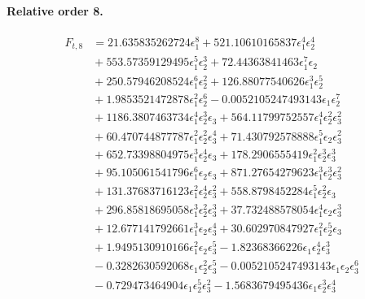 \documentclass[10pt]{article}
\begin{document}
\paragraph{Relative order 8.}
\begin{align*}
F_{t,8} &= 21.635835262724 \epsilon_{1}^{8} + 521.10610165837 \epsilon_{1}^{4} \epsilon_{2}^{4} \\
&{}  + 553.57359129495 \epsilon_{1}^{5} \epsilon_{2}^{3} + 72.44363841463 \epsilon_{1}^{7} \epsilon_{2} \\
&{}  + 250.57946208524 \epsilon_{1}^{6} \epsilon_{2}^{2} + 126.88077540626 \epsilon_{1}^{3} \epsilon_{2}^{5} \\
&{}  + 1.9853521472878 \epsilon_{1}^{2} \epsilon_{2}^{6} - 0.0052105247493143 \epsilon_{1} \epsilon_{2}^{7} \\
&{}  + 1186.3807463734 \epsilon_{1}^{4} \epsilon_{2}^{3} \epsilon_{3} + 564.11799752557 \epsilon_{1}^{4} \epsilon_{2}^{2} \epsilon_{3}^{2} \\
&{}  + 60.470744877787 \epsilon_{1}^{2} \epsilon_{2}^{2} \epsilon_{3}^{4} + 71.430792578888 \epsilon_{1}^{5} \epsilon_{2} \epsilon_{3}^{2} \\
&{}  + 652.73398804975 \epsilon_{1}^{3} \epsilon_{2}^{4} \epsilon_{3} + 178.2906555419 \epsilon_{1}^{2} \epsilon_{2}^{3} \epsilon_{3}^{3} \\
&{}  + 95.105061541796 \epsilon_{1}^{6} \epsilon_{2} \epsilon_{3} + 871.27654279623 \epsilon_{1}^{3} \epsilon_{2}^{3} \epsilon_{3}^{2} \\
&{}  + 131.37683716123 \epsilon_{1}^{2} \epsilon_{2}^{4} \epsilon_{3}^{2} + 558.8798452284 \epsilon_{1}^{5} \epsilon_{2}^{2} \epsilon_{3} \\
&{}  + 296.85818695058 \epsilon_{1}^{3} \epsilon_{2}^{2} \epsilon_{3}^{3} + 37.732488578054 \epsilon_{1}^{4} \epsilon_{2} \epsilon_{3}^{3} \\
&{}  + 12.677141792661 \epsilon_{1}^{3} \epsilon_{2} \epsilon_{3}^{4} + 30.602970847927 \epsilon_{1}^{2} \epsilon_{2}^{5} \epsilon_{3} \\
&{}  + 1.9495130910166 \epsilon_{1}^{2} \epsilon_{2} \epsilon_{3}^{5} - 1.82368366226 \epsilon_{1} \epsilon_{2}^{4} \epsilon_{3}^{3} \\
&{}  - 0.3282630592068 \epsilon_{1} \epsilon_{2}^{2} \epsilon_{3}^{5} - 0.0052105247493143 \epsilon_{1} \epsilon_{2} \epsilon_{3}^{6} \\
&{}  - 0.729473464904 \epsilon_{1} \epsilon_{2}^{5} \epsilon_{3}^{2} - 1.5683679495436 \epsilon_{1} \epsilon_{2}^{3} \epsilon_{3}^{4} \\

\end{align*}
\end{document}
